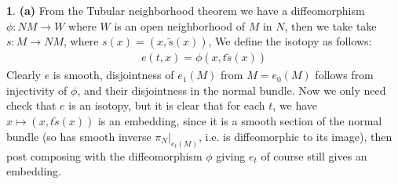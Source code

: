 \documentclass[10.5pt]{article}
\theoremstyle{definition}
\newtheorem{pb}{}
\begin{document}
    \begin{pb}
        \textbf{(a)} From the Tubular neighborhood theorem we have a diffeomorphism \(\phi: NM \to W\) where \(W\) is an open neighborhood of \(M\) in \(N\), then we take take \(s: M \to NM\), where \(s(x) = (x,\tilde{s}(x))\), We define the isotopy as follows:
        \begin{align*}
            e(t,x) = \phi(x,t\tilde{s}(x))
        \end{align*}
        Clearly \(e\) is smooth, disjointness of \(e_1(M)\) from \(M = e_0(M)\) follows from injectivity of \(\phi\), and their disjointness in the normal bundle. Now we only need check that \(e\) is an isotopy, but it is clear that for each \(t\), we have \(x \mapsto (x,t\tilde{s}(x))\) is an embedding, since it is a smooth section of the normal bundle (so has smooth inverse \(\pi_N\vert_{e_t(M)}\), i.e. is diffeomorphic to its image), then post composing with the diffeomorphism \(\phi\) giving \(e_t\) of course still gives an embedding.


\end{pb}
\end{document}
